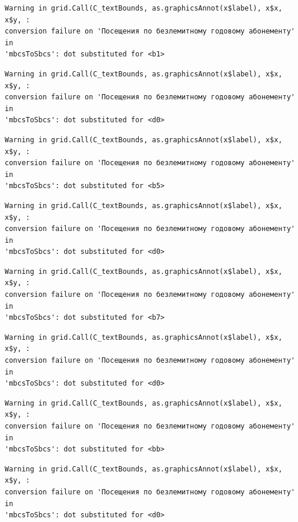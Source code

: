 \documentclass[
  letterpaper,
  DIV=11,
  numbers=noendperiod]{scrartcl}
\begin{document}
\begin{verbatim}
Warning in grid.Call(C_textBounds, as.graphicsAnnot(x$label), x$x, x$y, :
conversion failure on 'Посещения по безлемитному годовому абонементу' in
'mbcsToSbcs': dot substituted for <b1>
\end{verbatim}

\begin{verbatim}
Warning in grid.Call(C_textBounds, as.graphicsAnnot(x$label), x$x, x$y, :
conversion failure on 'Посещения по безлемитному годовому абонементу' in
'mbcsToSbcs': dot substituted for <d0>
\end{verbatim}

\begin{verbatim}
Warning in grid.Call(C_textBounds, as.graphicsAnnot(x$label), x$x, x$y, :
conversion failure on 'Посещения по безлемитному годовому абонементу' in
'mbcsToSbcs': dot substituted for <b5>
\end{verbatim}

\begin{verbatim}
Warning in grid.Call(C_textBounds, as.graphicsAnnot(x$label), x$x, x$y, :
conversion failure on 'Посещения по безлемитному годовому абонементу' in
'mbcsToSbcs': dot substituted for <d0>
\end{verbatim}

\begin{verbatim}
Warning in grid.Call(C_textBounds, as.graphicsAnnot(x$label), x$x, x$y, :
conversion failure on 'Посещения по безлемитному годовому абонементу' in
'mbcsToSbcs': dot substituted for <b7>
\end{verbatim}

\begin{verbatim}
Warning in grid.Call(C_textBounds, as.graphicsAnnot(x$label), x$x, x$y, :
conversion failure on 'Посещения по безлемитному годовому абонементу' in
'mbcsToSbcs': dot substituted for <d0>
\end{verbatim}

\begin{verbatim}
Warning in grid.Call(C_textBounds, as.graphicsAnnot(x$label), x$x, x$y, :
conversion failure on 'Посещения по безлемитному годовому абонементу' in
'mbcsToSbcs': dot substituted for <bb>
\end{verbatim}

\begin{verbatim}
Warning in grid.Call(C_textBounds, as.graphicsAnnot(x$label), x$x, x$y, :
conversion failure on 'Посещения по безлемитному годовому абонементу' in
'mbcsToSbcs': dot substituted for <d0>
\end{verbatim}
\end{document}
